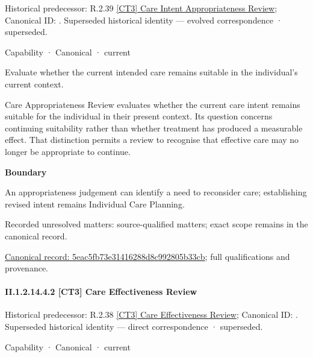 {\small Historical predecessor: R.2.39 \hyperref[element:905eb2de1ac341ac96331e3d7f76079b]{[CT3] Care Intent Appropriateness Review}; Canonical ID: \texttt{}. Superseded historical identity — evolved correspondence · superseded.}\par
\label{element:5eac5fb73e31416288d8c992805b33cb}
{\small Capability · Canonical · current}\par

Evaluate whether the current intended care remains suitable in the individual’s current context.



Care Appropriateness Review evaluates whether the current care intent remains suitable for the individual in their present context. Its question concerns continuing suitability rather than whether treatment has produced a measurable effect. That distinction permits a review to recognise that effective care may no longer be appropriate to continue.



\textbf{Boundary}



An appropriateness judgement can identify a need to reconsider care; establishing revised intent remains Individual Care Planning.


{\small Recorded unresolved matters: source-qualified matters; exact scope remains in the canonical record.}\par
{\footnotesize \href{../../../../../../../continuum/strategy/capability/5eac5fb73e31416288d8c992805b33cb.md}{Canonical record: 5eac5fb73e31416288d8c992805b33cb}; full qualifications and provenance.}\par
\paragraph*{II.1.2.14.4.2 [CT3] Care Effectiveness Review}
\label{navigation:II.1.2.14.4.2}

{\small Historical predecessor: R.2.38 \hyperref[element:31f49cdea9f44f188459503580c2b86e]{[CT3] Care Effectiveness Review}; Canonical ID: \texttt{}. Superseded historical identity — direct correspondence · superseded.}\par
\label{element:79cfeaefeb174a54ba43343d37f035c1}
{\small Capability · Canonical · current}\par

